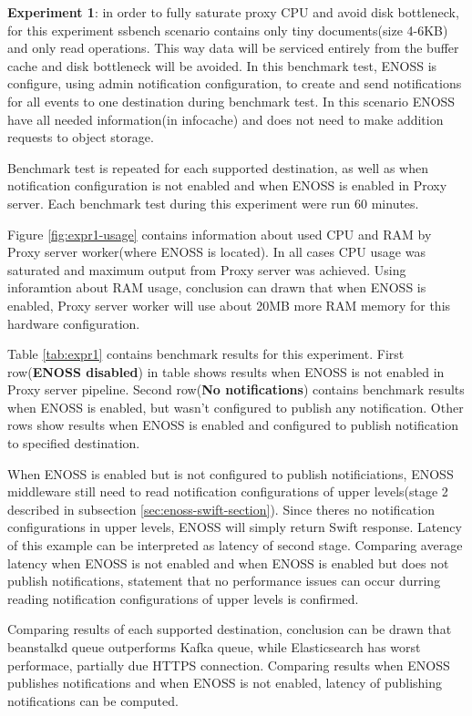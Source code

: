     \textbf{Experiment 1}: in order to fully saturate proxy CPU and avoid disk bottleneck, for this experiment ssbench scenario contains only tiny documents(size 4-6KB) and only read operations. This way data will be serviced entirely from the buffer cache and disk bottleneck will be avoided. In this benchmark test, ENOSS is configure, using admin notification configuration, to create and send notifications for all events to one destination during benchmark test. In this scenario ENOSS have all needed information(in infocache) and does not need to make addition requests to object storage.

    Benchmark test is repeated for each supported destination, as well as when notification configuration is not enabled and when ENOSS is enabled in Proxy server. Each benchmark test during this experiment were run 60 minutes.

    Figure \ref{fig:expr1-usage} contains information about used CPU and RAM by Proxy server worker(where ENOSS is located). In all cases CPU usage was saturated and maximum output from Proxy server was achieved. Using inforamtion about RAM usage, conclusion can drawn that when ENOSS is enabled, Proxy server worker will use about 20MB more RAM memory for this hardware configuration.

    Table \ref{tab:expr1} contains benchmark results for this experiment. First row(\textbf{ENOSS disabled}) in table shows results when ENOSS is not enabled in Proxy server pipeline. Second row(\textbf{No notifications}) contains benchmark results when ENOSS is enabled, but wasn't configured to publish any notification. Other rows show results when ENOSS is enabled and configured to publish notification to specified destination.

    When ENOSS is enabled but is not configured to publish notificiations, ENOSS middleware still need to read notification configurations of upper levels(stage 2 described in subsection \ref{sec:enoss-swift-section}). Since theres no notification configurations in upper levels, ENOSS will simply return Swift response. Latency of this example can be interpreted as latency of second stage. Comparing average latency when ENOSS is not enabled and when ENOSS is enabled but does not publish notifications, statement that no performance issues can occur durring reading notification configurations of upper levels is confirmed.

    Comparing results of each supported destination, conclusion can be drawn that beanstalkd queue outperforms Kafka queue, while Elasticsearch has worst performace, partially due HTTPS connection. Comparing results when ENOSS publishes notifications and when ENOSS is not enabled, latency of publishing notifications can be computed.

